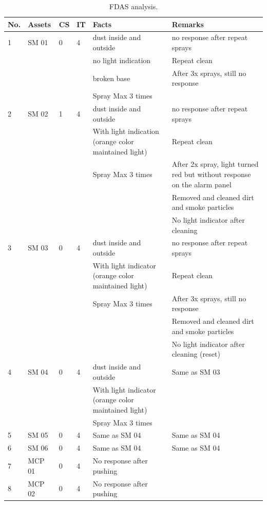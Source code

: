 \begin{table}[!h]
	\caption{FDAS analysis.}
	\label{ch05_tbl_fdas01}
	{\scriptsize
		\begin{tabular}{l|l|l|l|p{5cm}|p{5cm}}
			\hline
			No. & Assets & CS & IT & Facts & Remarks \\ 
			\hline
			1 & SM 01 & 0 & 4 & dust inside and outside & no response after repeat sprays \\ 
			&  &  &  & no light indication & Repeat clean \\ 
			&  &  &  & broken base & After 3x sprays, still no response \\ 
			&  &  &  & Spray Max 3 times &  \\ 
			\hline
			2 & SM 02 & 1 & 4 & dust inside and outside & no response after repeat sprays \\ 
			&  &  &  & With light indication (orange color maintained light) & Repeat clean \\ 
			&  &  &  & Spray Max 3 times & After 2x spray, light turned red but without response on the alarm panel \\ 
			&  &  &  &  & Removed and cleaned dirt and smoke particles \\ 
			&  &  &  &  & No light indicator after cleaning \\ 
			\hline
			3 & SM 03 & 0 & 4 & dust inside and outside & no response after repeat sprays \\ 
			&  &  &  & With light indicator (orange color maintained light) & Repeat clean \\ 
			&  &  &  & Spray Max 3 times & After 3x sprays, still no response \\ 
			&  &  &  &  & Removed and cleaned dirt and smoke particles \\ 
			&  &  &  &  & No light indicator after cleaning (reset) \\ 
			\hline
			4 & SM 04 & 0 & 4 & dust inside and outside & Same as SM 03 \\ 
			&  &  &  & With light indicator (orange color maintained light) &  \\ 
			&  &  &  & Spray Max 3 times &  \\ 
			\hline
			5 & SM 05 & 0 & 4 & Same as SM 04 & Same as SM 04 \\ 
			\hline
			6 & SM 06 & 0 & 4 & Same as SM 04 & Same as SM 04 \\ 
			\hline
			7 & MCP 01 & 0 & 4 & No response after pushing &  \\ 
			\hline
			8 & MCP 02 & 0 & 4 & No response after pushing &  \\ 

\end{tabular}}
\end{table}
